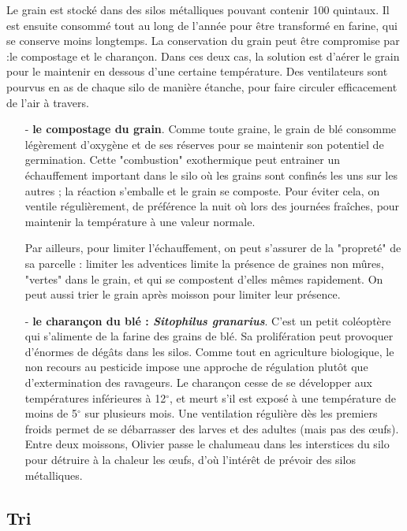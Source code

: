 \documentclass{article}
\begin{document}
Le grain est stocké dans des silos métalliques pouvant contenir 100 quintaux. Il est ensuite consommé tout au long de l'année pour être transformé en farine, qui se conserve moins longtemps. La conservation du grain peut être compromise par :le compostage et le charançon. Dans ces deux cas, la solution est d'aérer le grain pour le maintenir en dessous d'une certaine température. Des ventilateurs sont pourvus en as de chaque silo de manière étanche, pour faire circuler efficacement de l'air à travers. 

\begin{itemize}

	\item[-] \textbf{le compostage du grain}. Comme toute graine, le grain de blé consomme légèrement d'oxygène et de ses réserves pour se maintenir son potentiel de germination. Cette "combustion" exothermique peut entrainer un échauffement important dans le silo où les grains sont confinés les uns sur les autres ; la réaction s'emballe et le grain se composte. Pour éviter cela, on ventile régulièrement, de préférence la nuit où lors des journées fraîches, pour maintenir la température à une valeur normale. 
	
	Par ailleurs, pour limiter l'échauffement, on peut s'assurer de la "propreté" de sa parcelle : limiter les adventices limite la présence de graines non mûres, "vertes" dans le grain, et qui se compostent d'elles mêmes rapidement. On peut aussi trier le grain après moisson pour limiter leur présence.
	
	\item[-] \textbf{le charançon du blé : \textit{Sitophilus granarius}}. C'est un petit coléoptère qui s'alimente de la farine des grains de blé. Sa prolifération peut provoquer d'énormes de dégâts dans les silos. Comme tout en agriculture biologique, le non recours au pesticide impose une approche de régulation plutôt que d'extermination des ravageurs. Le charançon cesse de se développer aux températures inférieures à 12$^\circ$, et meurt s'il est exposé à une température de moins de 5$^\circ$ sur plusieurs mois. Une ventilation régulière dès les premiers froids permet de se débarrasser des larves et des adultes (mais pas des œufs). Entre deux moissons, Olivier passe le chalumeau dans les interstices du silo pour détruire à la chaleur les œufs, d'où l'intérêt de prévoir des silos métalliques. 
	
\end{itemize}

\subsection{Tri}
\end{document}
